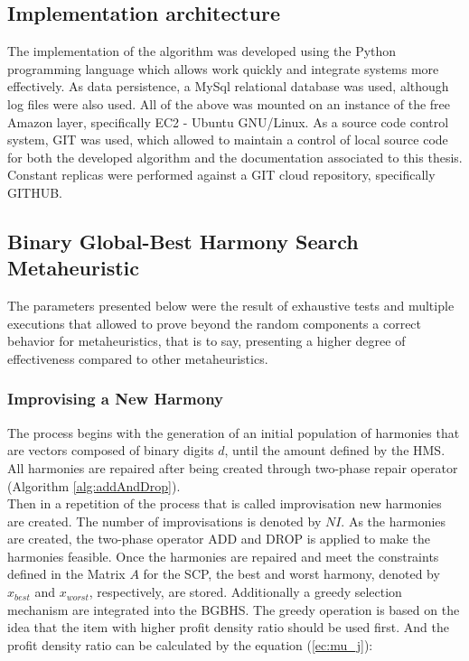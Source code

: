 \subsection{Implementation architecture}
The implementation of the algorithm was developed using the Python programming language which allows work quickly and integrate systems more effectively.
As data persistence, a MySql relational database was used, although log files were also used. All of the above was mounted on an instance of the free Amazon layer, specifically EC2 - Ubuntu GNU/Linux.
As a source code control system, GIT was used, which allowed to maintain a control of local source code for both the developed algorithm and the documentation associated to this thesis. Constant replicas were performed against a GIT cloud repository, specifically GITHUB.
 
\subsection{Binary Global-Best Harmony Search Metaheuristic}
The parameters presented below were the result of exhaustive tests and multiple executions that allowed to prove beyond the random components a correct behavior for metaheuristics, that is to say, presenting a higher degree of effectiveness compared to other metaheuristics.

\subsubsection{Improvising a New Harmony}
The process begins with the generation of an initial population of harmonies that are vectors composed of binary digits $d$, until the amount defined by the HMS. All harmonies are repaired after being created through two-phase repair operator (Algorithm \ref{alg:addAndDrop}).\\

Then in a repetition of the process that is called improvisation new harmonies are created. The number of improvisations is denoted by $NI$. As the harmonies are created, the two-phase operator ADD and DROP is applied to make the harmonies feasible. Once the harmonies are repaired and meet the constraints defined in the  Matrix $A$ for the SCP, the best and worst harmony, denoted by $x_ {best}$ and $x_ {worst}$, respectively, are stored. Additionally a greedy selection mechanism are integrated into the BGBHS. The greedy operation is based on the idea that the item with higher profit density ratio should be used first. And the profit density ratio can be calculated by the equation (\ref{ec:mu_j}): 

